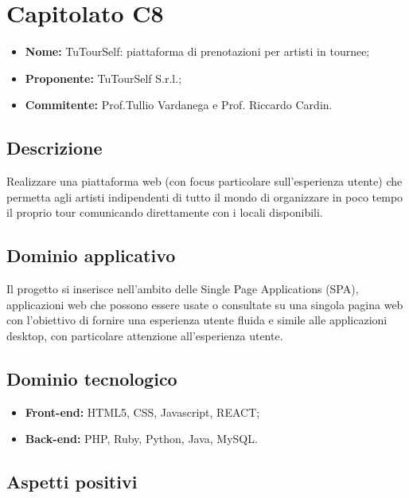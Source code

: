 \documentclass[openany,12pt,a4paper]{report}
\begin{document}

\section{Capitolato C8}

\begin{itemize}
    \item \textbf{Nome:} TuTourSelf: piattaforma di prenotazioni per artisti in tournee;
    \item \textbf{Proponente:} TuTourSelf S.r.l.;
    \item \textbf{Commitente:} Prof.Tullio Vardanega e Prof. Riccardo Cardin.
\end{itemize}

\subsection{Descrizione}

Realizzare una piattaforma web (con focus particolare sull'esperienza utente) che permetta agli artisti indipendenti di tutto il mondo di organizzare in poco tempo il proprio tour comunicando direttamente con i locali disponibili.

\subsection{Dominio applicativo}

Il progetto si inserisce nell'ambito delle Single Page Applications (SPA), applicazioni web che possono essere usate o consultate su una singola pagina web con l'obiettivo di fornire una esperienza utente fluida e simile alle applicazioni desktop, con particolare attenzione all'esperienza utente.

\subsection{Dominio tecnologico}

\begin{itemize}
    \item \textbf{Front-end:} HTML5, CSS, Javascript, REACT;
    
    \item \textbf{Back-end:}  PHP, Ruby, Python, Java, MySQL.
\end{itemize}

\subsection{Aspetti positivi}
\end{document}
